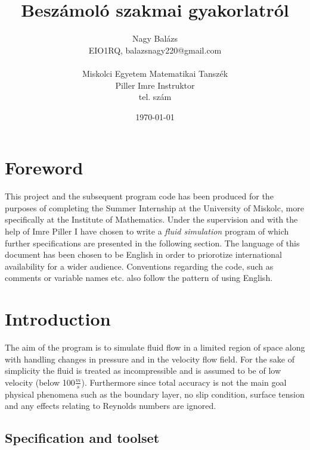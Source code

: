 \documentclass[12pt, titlepage]{article}
\begin{document}
\pagestyle{fancy}

\title{Beszámoló szakmai gyakorlatról}
\author{Nagy Balázs \\EIO1RQ, balazsnagy220@gmail.com\\\\Miskolci Egyetem Matematikai Tanszék\\Piller Imre Instruktor\\tel. szám}
\date{\today}
\maketitle

\tableofcontents

\pagebreak

\section{Foreword}

This project and the subsequent program code has been produced for the purposes of completing the Summer Internship at the University of Miskolc, more specifically at the Institute of Mathematics. Under the supervision and with the help of Imre Piller I have chosen to write a \textit{fluid simulation} program of which further specifications are presented in the following section. The language of this document has been chosen to be English in order to priorotize international availability for a wider audience. Conventions regarding the code, such as comments or variable names etc. also follow the pattern of using English.

\section{Introduction}

The aim of the program is to simulate fluid flow in a limited region of space along with handling changes in pressure and in the velocity flow field. For the sake of simplicity the fluid is treated as incompressible and is assumed to be of low velocity (below 100$\frac{m}{s}$). Furthermore since total accuracy is not the main goal physical phenomena such as the boundary layer, no slip condition, surface tension and any effects relating to Reynolds numbers are ignored.

\subsection{Specification and toolset}
\end{document}
